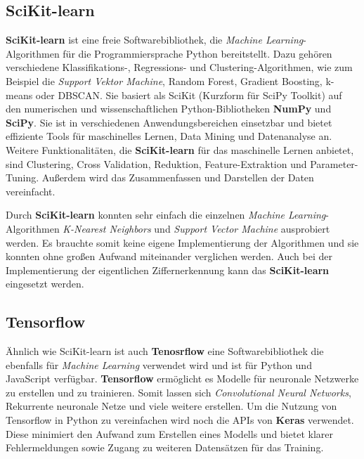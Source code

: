 \subsection{SciKit-learn}
\textbf{SciKit-learn} ist eine freie Softwarebibliothek, die \textit{Machine Learning}-Algorithmen für die Programmiersprache Python bereitstellt.
Dazu gehören verschiedene Klassifikations-, Regressions- und Clustering-Algorithmen, wie zum Beispiel die \textit{Support Vektor Machine},
Random Forest, Gradient Boosting, k-means oder DBSCAN. Sie basiert als SciKit (Kurzform für SciPy Toolkit)
auf den numerischen und wissenschaftlichen Python-Bibliotheken \textbf{NumPy} und \textbf{SciPy}.
Sie ist in verschiedenen Anwendungsbereichen einsetzbar und bietet effiziente Tools für maschinelles Lernen, Data Mining und Datenanalyse an.
Weitere Funktionalitäten, die \textbf{SciKit-learn} für das maschinelle Lernen anbietet, sind Clustering, Cross Validation, Reduktion, Feature-Extraktion und Parameter-Tuning.
Außerdem wird das Zusammenfassen und Darstellen der Daten vereinfacht.

Durch \textbf{SciKit-learn} konnten sehr einfach die einzelnen \textit{Machine Learning}-Algorithmen \textit{K-Nearest Neighbors} und \textit{Support Vector Machine} ausprobiert werden. Es brauchte somit keine eigene Implementierung der Algorithmen und sie konnten ohne großen Aufwand miteinander verglichen werden. Auch bei der Implementierung der eigentlichen Ziffernerkennung kann das \textbf{SciKit-learn} eingesetzt werden.

\subsection{Tensorflow}
Ähnlich wie SciKit-learn ist auch \textbf{Tenosrflow} eine Softwarebibliothek die ebenfalls für \textit{Machine Learning} verwendet wird und ist für Python und JavaScript verfügbar. \textbf{Tensorflow} ermöglicht es Modelle für neuronale Netzwerke zu erstellen und zu trainieren. Somit lassen sich \textit{Convolutional Neural Networks}, Rekurrente neuronale Netze und viele weitere erstellen. Um die Nutzung von Tensorflow in Python zu vereinfachen wird noch die \acp{API} von \textbf{Keras} verwendet. Diese minimiert den Aufwand zum Erstellen eines Modells und bietet klarer Fehlermeldungen sowie Zugang zu weiteren Datensätzen für das Training.

